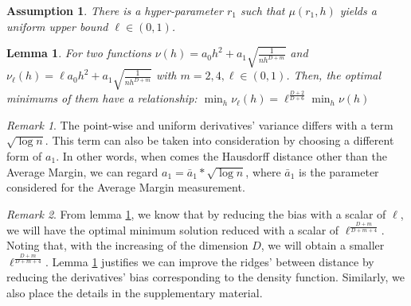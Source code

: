 \documentclass[aos,preprint]{imsart}
\newtheorem{lemma}[theorem]{Lemma}
\newtheorem{assumption}[theorem]{Assumption}
\theoremstyle{remark}
\newtheorem*{remark}{Remark}
\begin{document}
\begin{assumption}\label{assum}
There is a hyper-parameter $r_1$ such that $\mu(r_1,h)$ yields a uniform upper bound $\ell\in(0,1)$.
\end{assumption}
\begin{lemma}\label{improve_lemma}
For two functions $\nu(h) = a_0 h^2 + a_1 \sqrt{\frac{1}{nh^{D+m}}}$ and $\nu_\ell (h) = \ell a_0 h^2 + a_1 \sqrt{\frac{1}{nh^{D+m}}}$ with $m=2,4,\ell \in(0,1)$. Then, the optimal minimums of them have a relationship:  $\min_h \nu_\ell (h) = \ell^{\frac{D+2}{D+6}}\min_h \nu(h)$
\end{lemma} 
\begin{remark}
The point-wise and uniform derivatives' variance differs with a term $\sqrt{\log n}$. This term can also be taken into consideration by choosing a different form of $a_1$. In other words, when comes the Hausdorff distance other than the Average Margin, we can regard $a_1=\bar{a}_1*\sqrt{\log n}$, where $\bar{a}_1$ is the parameter considered for the Average Margin measurement.
\end{remark}
\begin{remark}
From lemma \ref{improve_lemma}, we know that by reducing the bias with a scalar of $\ell$, we will have the optimal minimum solution reduced with a scalar of $\ell^{\frac{D+m}{D+m+4}}$.  Noting that, with the increasing of the dimension $D$, we will obtain a smaller $\ell^{\frac{D+m}{D+m+4}}$. Lemma \ref{improve_lemma} justifies we can improve the ridges' between distance by reducing the derivatives' bias corresponding to the density function. Similarly, we also place the details in the supplementary material.%
\end{remark}
\end{document}
